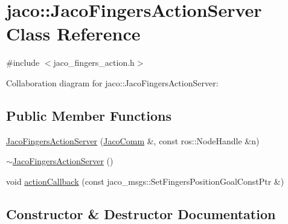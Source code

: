 \hypertarget{classjaco_1_1_jaco_fingers_action_server}{}\section{jaco\+:\+:Jaco\+Fingers\+Action\+Server Class Reference}
\label{classjaco_1_1_jaco_fingers_action_server}


{\ttfamily \#include $<$jaco\+\_\+fingers\+\_\+action.\+h$>$}



Collaboration diagram for jaco\+:\+:Jaco\+Fingers\+Action\+Server\+:
\subsection*{Public Member Functions}
\begin{DoxyCompactItemize}
\item 
\hyperlink{classjaco_1_1_jaco_fingers_action_server_aae225d4ab0745de98795cf7af2132d0c}{Jaco\+Fingers\+Action\+Server} (\hyperlink{classjaco_1_1_jaco_comm}{Jaco\+Comm} \&, const ros\+::\+Node\+Handle \&n)
\item 
\hyperlink{classjaco_1_1_jaco_fingers_action_server_a0497dec496f6224031096e5f6735e9c8}{$\sim$\+Jaco\+Fingers\+Action\+Server} ()
\item 
void \hyperlink{classjaco_1_1_jaco_fingers_action_server_a642f494b27d513457e9f29de7a4b31b6}{action\+Callback} (const jaco\+\_\+msgs\+::\+Set\+Fingers\+Position\+Goal\+Const\+Ptr \&)
\end{DoxyCompactItemize}


\subsection{Constructor \& Destructor Documentation}
